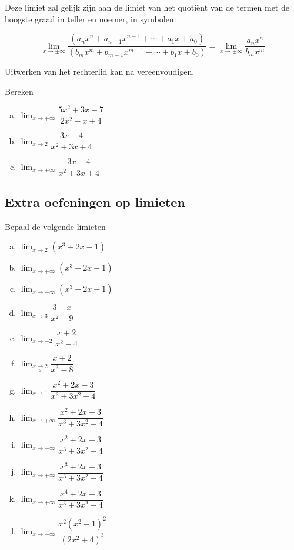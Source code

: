 \documentclass[12pt,twoside,a4paper]{article}
\newenvironment{eigenschap}
{
  \vspace{0.4cm}
  \begin{mdframed}[nobreak=true,frametitle={Eigenschap}]
  }{%
  \end{mdframed}
}
\begin{document}
Deze limiet zal gelijk zijn aan de limiet van het quotiënt van de termen met de hoogste graad in teller en noemer, in symbolen:

\begin{eigenschap}
  $$\lim_{x\to \pm\infty}\dfrac{\left(a_nx^n+a_{n-1}x^{n-1}+\cdots+a_1x+a_0\right)}{\left(b_mx^m+b_{m-1}x^{m-1}+\cdots+b_1x+b_0\right)}=\lim_{x\to \pm\infty}\dfrac{a_nx^n}{b_mx^m}$$
\end{eigenschap}

Uitwerken van het rechterlid kan na vereenvoudigen.

\begin{oefening}
  Bereken
  \begin{enumerate}[(a)]
  \itemsep.5em
  \item $\displaystyle\lim_{x\to+\infty}\dfrac{5x^2+3x-7}{2x^2-x+4}$
  \item $\displaystyle\lim_{x\to2}\dfrac{3x-4}{x^2+3x+4}$
  \item $\displaystyle\lim_{x\to+\infty}\dfrac{3x-4}{x^2+3x+4}$
  \end{enumerate}
\end{oefening}

\needspace{3cm}
\subsection{Extra oefeningen op limieten}

\begin{oefening}
  Bepaal de volgende limieten
  \begin{multicols}{3}
  \begin{enumerate}[(a)]
  \itemsep1em
  \item $\displaystyle\lim_{x\to 2}\left(x^3+2x-1\right)$
  \item $\displaystyle\lim_{x\to +\infty}\left(x^3+2x-1\right)$
  \item $\displaystyle\lim_{x\to -\infty}\left(x^3+2x-1\right)$
  \item $\displaystyle\lim_{x\to 3}\dfrac{3-x}{x^2-9}$
  \item $\displaystyle\lim_{x\to -2}\dfrac{x+2}{x^2-4}$
  \item $\displaystyle\lim_{x\underset{>}{\to} 2}\dfrac{x+2}{x^3-8}$
  \item $\displaystyle\lim_{x\to 1}\dfrac{x^2+2x-3}{x^3+3x^2-4}$
  \item $\displaystyle\lim_{x\to +\infty}\dfrac{x^2+2x-3}{x^3+3x^2-4}$
  \item $\displaystyle\lim_{x\to -\infty}\dfrac{x^2+2x-3}{x^3+3x^2-4}$
  \item $\displaystyle\lim_{x\to +\infty}\dfrac{x^3+2x-3}{x^3+3x^2-4}$
  \item $\displaystyle\lim_{x\to +\infty}\dfrac{x^4+2x-3}{x^3+3x^2-4}$
  \item $\displaystyle\lim_{x\to -\infty}\dfrac{x^2(x^2-1)^2}{(2x^2+4)^3}$
  \end{enumerate}
  \end{multicols}
\end{oefening}
\end{document}
